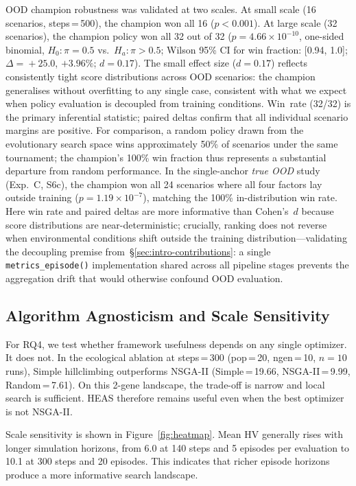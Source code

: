 \documentclass{wscpaperproc}
\begin{document}
OOD champion robustness was validated at two scales. At small scale (16
scenarios, steps\,=\,500), the champion won all 16 ($p\!<\!0.001$). At large
scale (32 scenarios), the champion policy
won all 32 out of 32 ($p\!=\!4.66\!\times\!10^{-10}$, one-sided binomial, $H_0\colon \pi\!=\!0.5$ vs.\ $H_a\colon \pi\!>\!0.5$;
Wilson 95\% CI for win fraction: [0.94, 1.0]; $\Delta\!=\!+25.0$, $+3.96\%$;
$d\!=\!0.17$). The small effect size ($d\!=\!0.17$) reflects consistently tight score distributions across OOD scenarios: the champion generalises without overfitting to any single case, consistent with what we expect when policy evaluation is decoupled from training conditions. Win~rate (32/32) is the primary inferential statistic; paired deltas confirm that all individual scenario margins are positive. For comparison, a random policy drawn from the evolutionary search space wins approximately 50\% of scenarios under the same tournament; the champion's 100\% win fraction thus represents a substantial departure from random performance. In the single-anchor \emph{true OOD} study (Exp.~C, S6c), the
champion won all 24 scenarios where all four factors lay outside training
($p\!=\!1.19\!\times\!10^{-7}$), matching the 100\% in-distribution win rate.
Here win rate and paired deltas are more informative than Cohen's~$d$ because score distributions are near-deterministic; crucially, ranking does not reverse when environmental conditions shift outside the training distribution---validating the decoupling premise from~\S\ref{sec:intro-contributions}: a single \texttt{metrics\_episode()} implementation shared across all pipeline stages prevents the aggregation drift that would otherwise confound OOD evaluation.


\subsection{Algorithm Agnosticism and Scale Sensitivity}
\label{sec:scale}

For RQ4, we test whether framework usefulness depends on any single optimizer.
It does not. In the ecological ablation at steps\,=\,300
(pop\,=\,20, ngen\,=\,10, $n\!=\!10$ runs), Simple hillclimbing outperforms
NSGA-II (Simple\,=\,19.66, NSGA-II\,=\,9.99, Random\,=\,7.61). On this
2-gene landscape, the trade-off is narrow and local search is sufficient. HEAS
therefore remains useful even when the best optimizer is not NSGA-II.

Scale sensitivity is shown in Figure~\ref{fig:heatmap}. Mean HV generally rises
with longer simulation horizons, from 6.0 at 140 steps and 5 episodes per
evaluation to 10.1 at 300 steps and 20 episodes. This indicates that richer
episode horizons produce a more informative search landscape.
\end{document}
